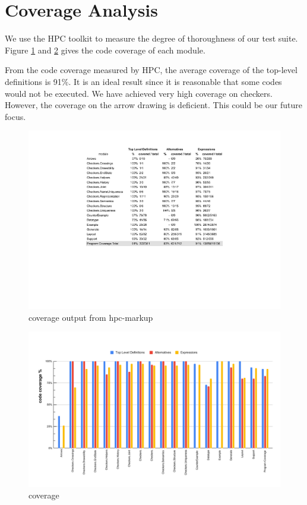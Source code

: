 \section{Coverage Analysis}

 We use the HPC toolkit \cite{gill_runciman_2007} to measure the degree of thoroughness of our test suite.
Figure \ref{fig:coverage1} and \ref{fig:coverage2} gives the code coverage of each module. 

From the code coverage measured by HPC, the average coverage of the top-level definitions is 91$\%$. It is an ideal result since it is reasonable that some codes would not be executed\cite{gill_runciman_2007}.
We have achieved very high coverage on checkers.
However, the coverage on the arrow drawing is deficient.
This could be our future focus.

\begin{figure}[ht]
    \centering
    \includegraphics[scale=0.65]{Bilder/coverage1.pdf}
    \caption{coverage output from hpc-markup}
    \label{fig:coverage1}
\end{figure}
\begin{figure}[ht]
    \centering
    \includegraphics[scale=0.4]{Bilder/coverage2.pdf}
    \caption{coverage}
    \label{fig:coverage2}
\end{figure}
\newpage
